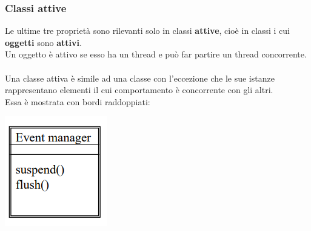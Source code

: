 \documentclass{article}
\begin{document}
	\subsubsection{Classi attive}
	Le ultime tre proprietà sono rilevanti solo in classi \textbf{attive}, cioè in classi i cui \textbf{oggetti} sono \textbf{attivi}.
	\vspace{\baselineskip} \\
	Un oggetto è attivo se esso ha un thread e può far partire un thread concorrente.
	\\\\
	Una classe attiva è simile ad una classe con l'eccezione che le sue istanze rappresentano elementi il cui comportamento è concorrente con gli altri. \\
	Essa è mostrata con bordi raddoppiati:
	\begin{center}
		\includegraphics[scale=0.7]{assets/uml_classi_attive.png}
	\end{center}
\end{document}
